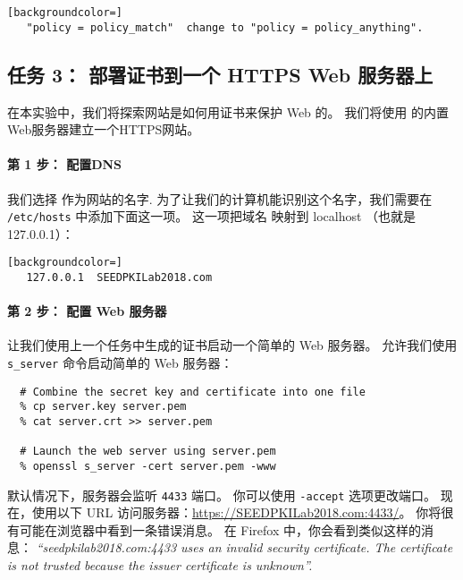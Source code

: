\begin{lstlisting}[backgroundcolor=]
   "policy = policy_match"  change to "policy = policy_anything".
\end{lstlisting}



\subsection{任务 3： 部署证书到一个 HTTPS Web 服务器上}

在本实验中，我们将探索网站是如何用证书来保护 Web 的。
我们将使用 \OpenSSL 的内置Web服务器建立一个HTTPS网站。


\paragraph{第 1 步： 配置DNS}
我们选择 {\pkiserver} 作为网站的名字.
为了让我们的计算机能识别这个名字，我们需要在 \texttt{/etc/hosts} 中添加下面这一项。
这一项把域名 {\pkiserver} 映射到 localhost （也就是 127.0.0.1）：


\begin{lstlisting}[backgroundcolor=]
   127.0.0.1  SEEDPKILab2018.com
\end{lstlisting}


\paragraph{第 2 步： 配置 Web 服务器}
让我们使用上一个任务中生成的证书启动一个简单的 Web 服务器。
\OpenSSL 允许我们使用 \texttt{s\_server} 命令启动简单的 Web 服务器：

\begin{lstlisting}
  # Combine the secret key and certificate into one file
  % cp server.key server.pem
  % cat server.crt >> server.pem

  # Launch the web server using server.pem
  % openssl s_server -cert server.pem -www
\end{lstlisting}

默认情况下，服务器会监听 {\tt 4433} 端口。
你可以使用 {\tt -accept} 选项更改端口。
现在，使用以下 URL 访问服务器：\url{https://SEEDPKILab2018.com:4433/}。
你将很有可能在浏览器中看到一条错误消息。
在 Firefox 中，你会看到类似这样的消息：
{\em ``seedpkilab2018.com:4433 uses an invalid security certificate. The certificate is not trusted because the issuer certificate is unknown''.}


